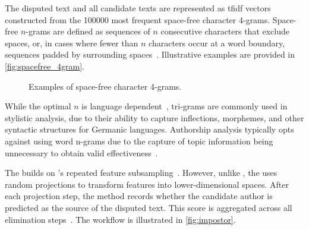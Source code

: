 The disputed text and all candidate texts are represented as \ac{tfidf} vectors constructed from the \num{100000} most frequent space-free character 4-grams. 
Space-free $n$-grams are defined as sequences of $n$ consecutive characters that exclude spaces, or, in cases where fewer than $n$ characters occur at a word boundary, sequences padded by surrounding spaces~\citep{koppel_authorship_2011,neal_surveying_2018}. 
Illustrative examples are provided in \autoref{fig:spacefree_4gram}.

\begin{figure}[ht]
    \centering
    \caption{Examples of space-free character 4-grams.}
    \label{fig:spacefree_4gram}
\end{figure}

While the optimal $n$ is language dependent~\citep{neal_surveying_2018}, tri-grams are commonly used in stylistic analysis, due to their ability to capture inflections, %
morphemes, %
and other syntactic structures for Germanic languages.
Authorship analysis typically opts against using word n-grams due to the capture of topic information being unnecessary to obtain valid effectiveness~\citep{Sapkota_ngrams_2015}.


The \impAppr{} builds on \unmasking{}'s repeated feature subsampling~\citep{koppel_authorship_2004}. 
However, unlike \unmasking{}, the \impAppr{} uses random projections to transform features into lower-dimensional spaces.
After each projection step, the method records whether the candidate author is predicted as the source of the disputed text. 
This score is aggregated across all elimination steps~\citep{tyo_state_2022}.
The workflow is illustrated in \autoref{fig:impostor}.

